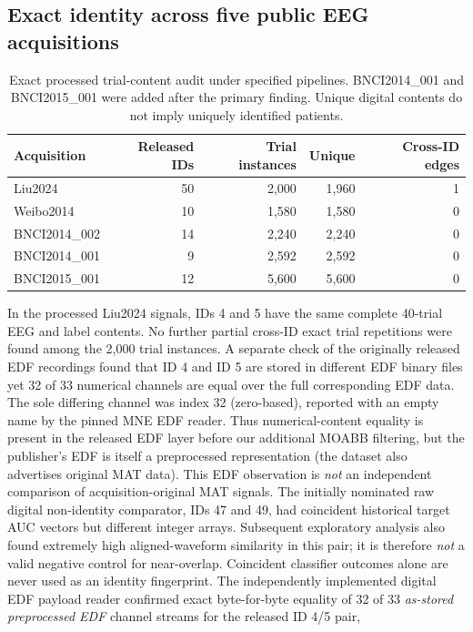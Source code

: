 \documentclass[preprint,12pt]{elsarticle}
\begin{document}
\subsection{Exact identity across five public EEG acquisitions}
\begin{table}[ht]\centering\small
\caption{Exact processed trial-content audit under
specified pipelines. BNCI2014\_001 and BNCI2015\_001
were added after the primary finding. Unique digital
contents do not imply uniquely identified patients.}
\begin{tabular}{lrrrr}
\toprule
Acquisition & Released IDs & Trial instances & Unique & Cross-ID edges\\\midrule
Liu2024 &50&2,000&1,960&1\\
Weibo2014 &10&1,580&1,580&0\\
BNCI2014\_002 &14&2,240&2,240&0\\
BNCI2014\_001 &9&2,592&2,592&0\\
BNCI2015\_001 &12&5,600&5,600&0\\
\bottomrule
\end{tabular}\end{table}
In the processed Liu2024 signals, IDs 4 and 5 have the same complete
40-trial EEG and label contents. No further partial cross-ID exact
trial repetitions were found among the 2,000 trial instances.
A separate check of the originally released EDF recordings found
that ID 4 and ID 5 are stored in different EDF binary files yet
32 of 33 numerical channels are equal over the full corresponding
EDF data. The sole differing channel was index 32 (zero-based),
reported with an empty name by the pinned MNE EDF reader.
Thus numerical-content equality is present in the
released EDF layer before our additional MOABB filtering,
but the publisher's EDF is itself a preprocessed
representation (the dataset also advertises original MAT data).
This EDF observation is \emph{not} an independent
comparison of acquisition-original MAT signals. The initially nominated raw digital non-identity comparator,
IDs 47 and 49, had coincident historical target AUC vectors
but different integer arrays. Subsequent exploratory analysis
also found extremely high aligned-waveform similarity in this
pair; it is therefore \emph{not} a valid negative control for
near-overlap. Coincident classifier outcomes alone are never
used as an identity fingerprint.
The independently implemented digital EDF payload reader
confirmed exact byte-for-byte equality of 32 of 33
\emph{as-stored preprocessed EDF} channel streams
for the released ID 4/5 pair,
\end{document}
